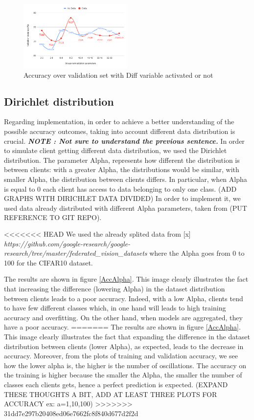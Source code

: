 \documentclass[twocolumn]{article}
\begin{document}
\begin{figure}
    \centering
    \includegraphics[width=0.5\textwidth,height=.3\textheight]{groupnormalizationDeltaNoDelta.png}
    \caption{Accuracy over validation set with Diff variable activated or not}
     \label{AccDiff} 
\end{figure}

\subsection{Dirichlet distribution}

Regarding implementation, in order to achieve a better understanding of the possible accuracy outcomes, taking into account different data distribution is crucial. \textbf{\emph{NOTE : Not sure to understand the previous sentence.}} In order to simulate client getting different data distribution, we used the Dirichlet distribution. The parameter Alpha, represents how different the distribution is between clients: with a greater Alpha, the distributions 
would be similar, with smaller Alpha, the distribution between clients differs.
In particular, when Alpha is equal to 0 each client has access to data belonging to only one class.
(ADD GRAPHS WITH DIRICHLET DATA DIVIDED)
In order to implement it, we used data already distributed with different Alpha parameters, taken from (PUT REFERENCE TO GIT REPO).

<<<<<<< HEAD
We used the already splited data from [x] \emph{https://github.com/google-research/google-research/tree/master/federated_vision_datasets} where the Alpha goes from 0 to 100 for the CIFAR10 dataset.

The results are shown in figure \ref{AccAlpha}. This image clearly illustrates the fact that increasing the difference (lowering Alpha) in the dataset distribution between clients leads to a poor accuracy. Indeed, with a low Alpha, clients tend to have few different classes which, in one hand will leads to high training accuracy and overfitting. On the other hand, when models are aggregated, they have a poor accuracy.
=======
The results are shown in figure \ref{AccAlpha}. This image clearly illustrates the fact that expanding the difference in the dataset distribution between clients (lower Alpha), as expected, leads to the decrease in accuracy. 
Moreover, from the plots of training and validation accuracy, we see how the lower alpha is, the higher is the number of oscillations.
The accuracy on the training is higher because the smaller the Alpha, the smaller the number of classes each clients gets, hence a perfect prediction is expected. 
(EXPAND THESE THOUGHTS A BIT, ADD AT LEAST THREE PLOTS FOR ACCURACY ex: a=1,10,100)
>>>>>>> 31dd7e297b20408ed06e7662fc8f840d677d2f2d
\end{document}
